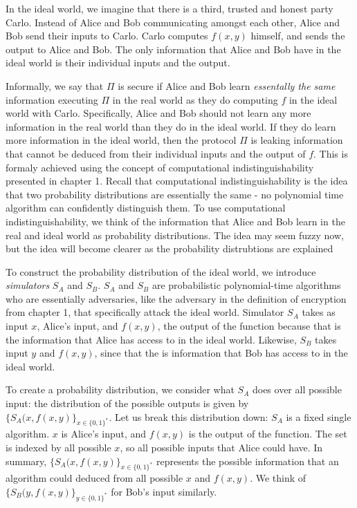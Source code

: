 In the ideal world, we imagine that there is a third, trusted and honest party Carlo.
Instead of Alice and Bob communicating amongst each other, Alice and Bob send their inputs to Carlo.
Carlo computes $f(x,y)$ himself, and sends the output to Alice and Bob.
The only information that Alice and Bob have in the ideal world is their individual inputs and the output.

Informally, we say that $\Pi$ is secure if Alice and Bob learn \textit{essentally the same} information executing $\Pi$ in the real world as they do computing $f$ in the ideal world with Carlo.
Specifically, Alice and Bob should not learn any more information in the real world than they do in the ideal world.
If they do learn more information in the ideal world, then the protocol $\Pi$ is leaking information that cannot be deduced from their individual inputs and the output of $f$.
This is formaly achieved using the concept of computational indistinguishability presented in chapter 1. 
Recall that computational indistinguishability is the idea that two probability distributions are essentially the same - no polynomial time algorithm can confidently distinguish them.
To use computational indistinguishability, we think of the information that Alice and Bob learn in the real and ideal world as probability distributions.
The idea may seem fuzzy now, but the idea will become clearer as the probability distrubtions are explained

To construct the probability distribution of the ideal world, we introduce \textit{simulators} $S_A$ and $S_B$.
$S_A$ and $S_B$ are probabilistic polynomial-time algorithms who are essentially adversaries, like the adversary in the definition of encryption from chapter 1, that specifically attack the ideal world.
Simulator $S_A$ takes as input $x$, Alice's input, and $f(x,y)$, the output of the function because that is the information that Alice has access to in the ideal world.
Likewise, $S_B$ takes input $y$ and $f(x,y)$, since that the is information that Bob has access to in the ideal world.

To create a probability distribution, we consider what $S_A$ does over all possible input: the distribution of the possible outputs is given by $\{S_A(x, f(x,y)\}_{x \in \{0,1\}^*}$.
Let us break this distribution down: $S_A$ is a fixed single algorithm.
$x$ is Alice's input, and $f(x,y)$ is the output of the function.
The set is indexed by all possible $x$, so all possible inputs that Alice could have.
In summary, $\{S_A(x, f(x,y)\}_{x \in \{0,1\}^*}$ represents the possible information that an algorithm could deduced from all possible $x$ and $f(x,y)$.
We think of $\{S_B(y, f(x,y)\}_{y \in \{0,1\}^*}$ for Bob's input similarly.

